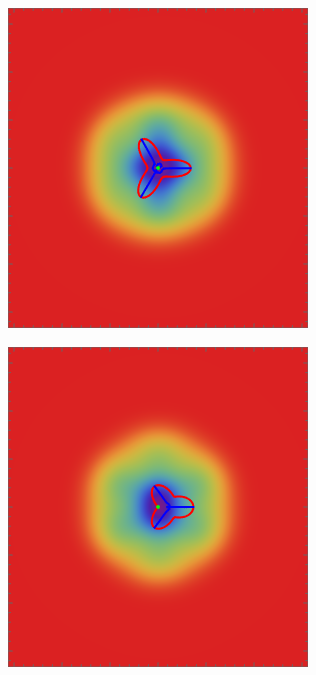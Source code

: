 \documentclass[a4paper, 11pt]{article}
\begin{document}
\begin{figure}
\begin{subfigure}[b]{0.24\textwidth}
\end{subfigure}
\begin{subfigure}[b]{0.24\textwidth}
\includegraphics[width=\textwidth]{Elliptic_mean_delta_var}
\end{subfigure}
\begin{subfigure}[b]{0.24\textwidth}
\includegraphics[width=\textwidth]{Hyperbolic_mean_delta_var}

\end{subfigure}
\end{figure}
\end{document}
